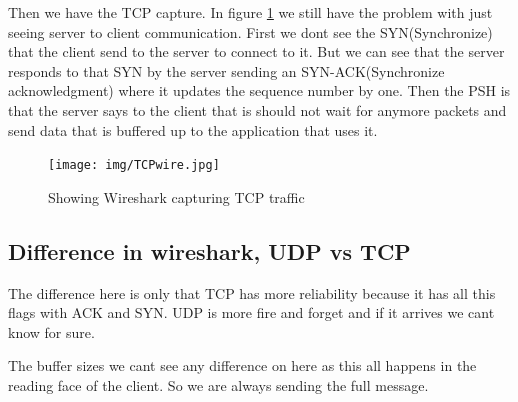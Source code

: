 \documentclass[a4paper,12pt]{article}
\numberwithin{figure}{section}
\begin{document}
\noindent Then we have the TCP capture. In figure \ref{TCPwire} we still have the problem with just seeing server to client communication. First we dont see the SYN(Synchronize) that the client send to the server to connect to it. But we can see that the server responds to that SYN by the server sending an SYN-ACK(Synchronize acknowledgment) where it updates the sequence number by one. Then the PSH is that the server says to the client that is should not wait for anymore packets and send data that is buffered up to the application that uses it. 

\begin{figure}[h!]
	\centering
	\texttt{[image: img/TCPwire.jpg]} 
	\caption{Showing Wireshark capturing TCP traffic}
	\label{TCPwire}
\end{figure}

\subsection{Difference in wireshark, UDP vs TCP}

The difference here is only that TCP has more reliability because it has all this flags with ACK and SYN. UDP is more fire and forget and if it arrives we cant know for sure. 

The buffer sizes we cant see any difference on here as this all happens in the reading face of the client. So we are always sending the full message.  

\newpage


\end{document}

